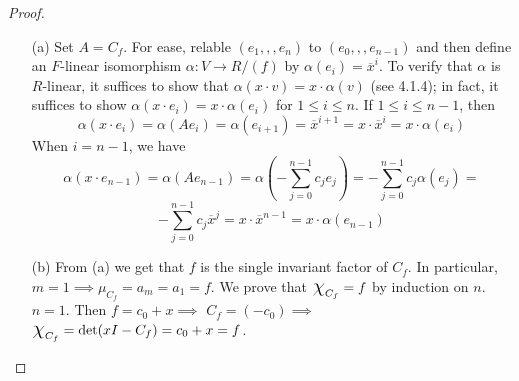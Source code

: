 \documentclass[11pt]{book}
\theoremstyle{definition}   \newtheorem{defn}[counter]{Definition} %
\newcommand{\ov}{\overline}   \newcommand{\wt}{\widetilde}
\newcommand{\Chi}{\mbox{\Large $\chi$}}
\DeclareMathOperator{\ra}{\rightarrow}   \DeclareMathOperator{\Poly}{\mathbf{P}}   \DeclareMathOperator{\spn}{\textnormal{span}}   \DeclareMathOperator{\aut}{\textnormal{Aut}}
\numberwithin{counter}{chapter}
\begin{document}
\begin{proof}\
\begin{enumerate}
\item[(a)] Set $A = C_f$.  For ease, relable $(e_1,,,e_n)$ to $(e_0,,,e_{n-1})$ and then define an $F$-linear isomorphism $\alpha : V \ra R/(f)$ by $\alpha(e_i) = \ov{x}^{i}$. To verify that $\alpha$ is $R$-linear, it suffices to show that $\alpha(x \cdot v) = x \cdot \alpha(v)$ (see 4.1.4); in fact, it suffices to show $\alpha(x \cdot e_i) = x \cdot \alpha(e_i)$ for $1 \leq i \leq n$. If $1 \leq i \leq n-1$, then
	\[\alpha(x \cdot e_i) = \alpha(A e_i) = \alpha(e_{i+1}) = \ov{x}^{i+1} = x \cdot \ov{x}^{i} = x \cdot \alpha(e_i) \]
When $i = n-1$, we have
	\[\alpha(x \cdot e_{n-1}) = \alpha(A e_{n-1}) = \alpha\left(-\sum_{j=0}^{n-1} c_j e_j \right) = -\sum_{j=0}^{n-1} c_j \alpha(e_j) =\]
	\[ -\sum_{j=0}^{n-1} c_j \ov{x}^{j}  = x \cdot \ov{x}^{n-1} = x \cdot \alpha(e_{n-1}) \]

\item[(b)] From (a) we get that $f$ is the single invariant factor of $C_f$. In particular, $m = 1 \implies \mu_{C_f} = a_m = a_1 = f$. We prove that $\Chi_{C_f} = f$ by induction on $n$. \\

$n = 1$. Then $f = c_0 + x \implies $ $C_f = (-c_0) \implies $ $\Chi_{C_f} = \det(xI - C_f) = c_0 + x = f$. \\


\end{enumerate}
\end{proof}
\end{document}
